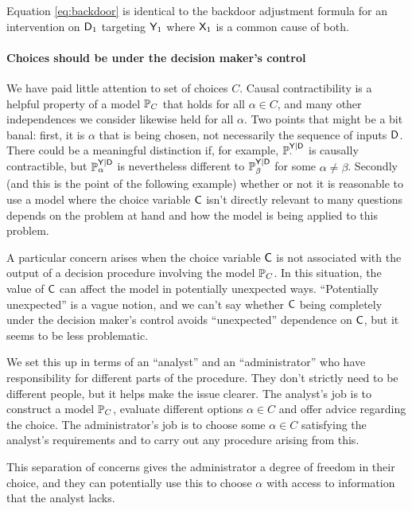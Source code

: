 Equation \ref{eq:backdoor} is identical to the backdoor adjustment formula \citep[Chap. 1]{pearl_causality:_2009} for an intervention on $\mathsf{D}_1$ targeting $\mathsf{Y}_1$ where $\mathsf{X}_1$ is a common cause of both.

\paragraph{Choices should be under the decision maker's control}\label{sec:dm_control}

We have paid little attention to set of choices $C$. Causal contractibility is a helpful property of a model $\mathbb{P}_C$ that holds for all $\alpha\in C$, and many other independences we consider likewise held for all $\alpha$. Two points that might be a bit banal: first, it is $\alpha$ that is being chosen, not necessarily the sequence of inputs $\mathsf{D}$. There could be a meaningful distinction if, for example, $\mathbb{P}_\cdot^{\mathsf{Y}|\mathsf{D}}$ is causally contractible, but $\mathbb{P}_\alpha^{\mathsf{Y}|\mathsf{D}}$ is nevertheless different to $\mathbb{P}_\beta^{\mathsf{Y}|\mathsf{D}}$ for some $\alpha\neq\beta$. Secondly (and this is the point of the following example) whether or not it is reasonable to use a model where the choice variable $\mathsf{C}$ isn't directly relevant to many questions depends on the problem at hand and how the model is being applied to this problem. 

A particular concern arises when the choice variable $\mathsf{C}$ is not associated with the output of a decision procedure involving the model $\mathbb{P}_C$. In this situation, the value of $\mathsf{C}$ can affect the model in potentially unexpected ways. ``Potentially unexpected'' is a vague notion, and we can't say whether $\mathsf{C}$ being completely under the decision maker's control avoids ``unexpected'' dependence on $\mathsf{C}$, but it seems to be less problematic.

We set this up in terms of an ``analyst'' and an ``administrator'' who have responsibility for different parts of the procedure. They don't strictly need to be different people, but it helps make the issue clearer. The analyst's job is to construct a model $\mathbb{P}_C$, evaluate different options $\alpha\in C$ and offer advice regarding the choice. The administrator's job is to choose some $\alpha\in C$ satisfying the analyst's requirements and to carry out any procedure arising from this.

This separation of concerns gives the administrator a degree of freedom in their choice, and they can potentially use this to choose $\alpha$ with access to information that the analyst lacks.

